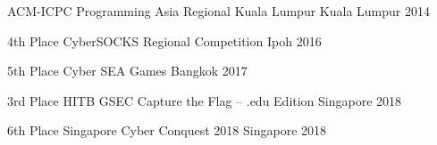 



\begin{cvhonors}

  \cvhonor
    {}
    {ACM-ICPC Programming Asia Regional Kuala Lumpur} %
    {Kuala Lumpur} %
    {2014} %

  \cvhonor
    {4th Place} %
    {CyberSOCKS Regional Competition} %
    {Ipoh} %
    {2016} %

  \cvhonor
    {5th Place} %
    {Cyber SEA Games} %
    {Bangkok} %
    {2017} %

  \cvhonor
    {3rd Place} %
    {HITB GSEC Capture the Flag – .edu Edition} %
    {Singapore} %
    {2018} %

  \cvhonor
    {6th Place} %
    {Singapore Cyber Conquest 2018} %
    {Singapore} %
    {2018} %

\end{cvhonors}




